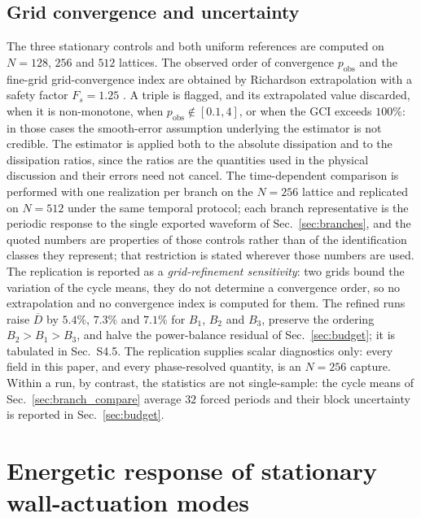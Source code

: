 \documentclass[11pt,a4paper]{article}
\newcommand{\Dbar}{\overline{D}}
\newenvironment{chgadd}{\par\color{blue}}{\par\color{black}}
\begin{document}
\begin{chgadd}
\subsection{Grid convergence and uncertainty}
\label{sec:gci}

The three stationary controls and both uniform references are computed on
$N=128$, $256$ and $512$ lattices. The observed order of convergence
$p_{\mathrm{obs}}$ and the fine-grid grid-convergence index are obtained by
Richardson extrapolation with a safety factor $F_s=1.25$
\cite{roache1994perspective,celik2008procedure}. A triple is flagged, and its
extrapolated value discarded, when it is non-monotone, when
$p_{\mathrm{obs}}\notin[0.1,4]$, or when the GCI exceeds $100\%$: in those cases
the smooth-error assumption underlying the estimator is not credible. The
estimator is applied both to the absolute dissipation and to the dissipation
ratios, since the ratios are the quantities used in the physical discussion and
their errors need not cancel. The time-dependent comparison is performed with one
realization per branch on the $N=256$ lattice and replicated on $N=512$ under the
same temporal protocol; each branch representative is the
periodic response to the single exported waveform of Sec.~\ref{sec:branches}, and
the quoted numbers are properties of those controls rather than of the
identification classes they represent; that restriction is stated wherever those
numbers are used. The replication is reported as a \emph{grid-refinement
sensitivity}: two grids bound the variation of the cycle means, they do not
determine a convergence order, so no extrapolation and no convergence index is
computed for them. The refined runs raise $\Dbar$ by $5.4\%$, $7.3\%$ and $7.1\%$
for $B_1$, $B_2$ and $B_3$, preserve the ordering $B_2>B_1>B_3$, and halve the
power-balance residual of Sec.~\ref{sec:budget}; it is tabulated in Sec.~S4.5.
The replication supplies scalar diagnostics only: every field in this paper, and
every phase-resolved quantity, is an $N=256$ capture.
Within a run, by contrast, the
statistics are not single-sample:
the cycle means of Sec.~\ref{sec:branch_compare} average $32$ forced periods and
their block uncertainty is reported in Sec.~\ref{sec:budget}.
\end{chgadd}

\section{Energetic response of stationary wall-actuation modes}
\label{sec:stationary}
\end{document}
